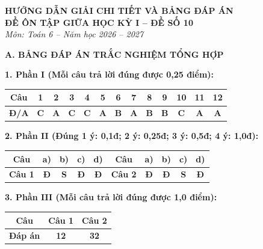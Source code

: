 \documentclass[12pt,a4paper]{article}
\begin{document}
\begin{center}
  \textbf{\Large HƯỚNG DẪN GIẢI CHI TIẾT VÀ BẢNG ĐÁP ÁN}\\
  \textbf{\large ĐỀ ÔN TẬP GIỮA HỌC KỲ I -- ĐỀ SỐ 10}\\
  \textit{Môn: Toán 6 -- Năm học 2026 -- 2027}
\end{center}
\vspace{2mm}

\noindent\textbf{\large A. BẢNG ĐÁP ÁN TRẮC NGHIỆM TỔNG HỢP}
\vspace{1.5mm}

\noindent\textbf{1. Phần I (Mỗi câu trả lời đúng được 0,25 điểm):}
\begin{center}
\begin{tabular}{|c|c|c|c|c|c|c|c|c|c|c|c|c|}
\hline
\textbf{Câu} & \textbf{1} & \textbf{2} & \textbf{3} & \textbf{4} & \textbf{5} & \textbf{6} & \textbf{7} & \textbf{8} & \textbf{9} & \textbf{10} & \textbf{11} & \textbf{12} \\
\hline
\textbf{Đ/A} & \textbf{C} & \textbf{A} & \textbf{C} & \textbf{C} & \textbf{A} & \textbf{B} & \textbf{A} & \textbf{B} & \textbf{B} & \textbf{C} & \textbf{A} & \textbf{A} \\
\hline
\end{tabular}
\end{center}
\vspace{1mm}

\noindent\textbf{2. Phần II (Đúng 1 ý: 0,1đ; 2 ý: 0,25đ; 3 ý: 0,5đ; 4 ý: 1,0đ):}
\begin{center}
\begin{tabular}{|c|c|c|c|c||c|c|c|c|c|}
\hline
\textbf{Câu} & \textbf{a)} & \textbf{b)} & \textbf{c)} & \textbf{d)} & \textbf{Câu} & \textbf{a)} & \textbf{b)} & \textbf{c)} & \textbf{d)} \\
\hline
\textbf{Câu 1} & \textbf{Đ} & \textbf{S} & \textbf{Đ} & \textbf{Đ} & \textbf{Câu 2} & \textbf{Đ} & \textbf{Đ} & \textbf{S} & \textbf{Đ} \\
\hline
\end{tabular}
\end{center}
\vspace{1mm}

\noindent\textbf{3. Phần III (Mỗi câu trả lời đúng được 1,0 điểm):}
\begin{center}
\begin{tabular}{|c|c|c|}
\hline
\textbf{Câu} & \textbf{Câu 1} & \textbf{Câu 2} \\
\hline
\textbf{Đáp án} & \textbf{12} & \textbf{32} \\
\hline
\end{tabular}
\end{center}
\vspace{3mm}
\end{document}
